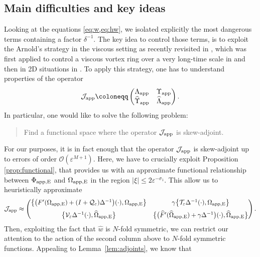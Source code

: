 \documentclass[11pt,reqno,a4paper]{amsart}
\def\eps{\varepsilon}
\newcommand{\cJ}{\mathcal{J}}
\newcommand{\cO}{\mathcal{O}}
\newcommand{\cQ}{\mathcal{Q}}
\newcommand{\cT}{\mathcal{T}}
\newcommand{\cV}{\mathcal{V}}
\newcommand{\app}{\mathrm{app}}
\newcommand{\1}{\mathbbm{1}}
\theoremstyle{definition}
\theoremstyle{definition}
\numberwithin{equation}{section}
\begin{document}
\subsection{Main difficulties and key ideas}
\label{sec:ideas}
Looking at the equations \cref{eq:w,eq:hw}, we isolated explicitly the most dangerous terms containing a factor $\delta^{-1}$.
The key idea to control those terms, is to exploit the Arnold's strategy in the viscous setting as recently revisited in \cite{GaSarnold}, which was first applied to control a viscous vortex ring over a very long-time scale in \cite{GaSring} and then in 2D situations in \cite{dolce2024long,zhang2025long}. To apply this strategy, one has to understand  properties of the operator \begin{align}
\label{def:Japp}
    \cJ_{\rm app}\coloneqq\begin{pmatrix}
        \Lambda_{\app} & \Upsilon_{\app}\\\widehat{\Upsilon}_{\app}
        &\widehat{\Lambda}_{\app}
\end{pmatrix}.
\end{align}
In particular, one would like to solve the following problem:
\begin{quote}
\centering
    Find a functional space where the operator $\cJ_{\rm app}$ 
is skew-adjoint. 
\end{quote}
For our purposes, it is in fact enough that the operator $\cJ_{\rm app}$ is skew-adjoint up to errors of order $\cO(\eps^{M+1})$. Here, we have to crucially exploit Proposition \ref{prop:functional}, that provides us with an approximate functional relationship between $\Phi_{\rm app,E}$ and $\Omega_{\rm app,E}$  in the region $|\xi|\leq 2\eps^{-\sigma_1}$.  This allow us to heuristically approximate
\begin{align}
\label{eq:Jappapp}
    \cJ_{\rm app}\approx \begin{pmatrix}
       \big\{ \big(F'(\Omega_{\rm app,E})+(I+\cQ_{\eps})\Delta^{-1}\big)(\cdot),\Omega_{\rm app,E}\big\}& \gamma \big\{\cT_{\eps}\Delta^{-1}(\cdot),\Omega_{\rm app,E} \big\}
       \\[6pt]
       \big\{\cV_{\eps}\Delta^{-1}(\cdot),\widehat{\Omega}_{\rm app,E} \big\}
        &\big\{ \big(\widehat{F}'(\widehat{\Omega}_{\rm app,E})+\gamma\Delta^{-1}\big)(\cdot),\widehat{\Omega}_{\rm app,E}\big\}
\end{pmatrix}.
\end{align}
Then, exploiting the fact that $\widehat{w}$ is $N$-fold symmetric, we can restrict our attention to the action of the second column above to $N$-fold symmetric functions. Appealing to Lemma~\ref{lem:adjoints}, we know that 
\end{document}
